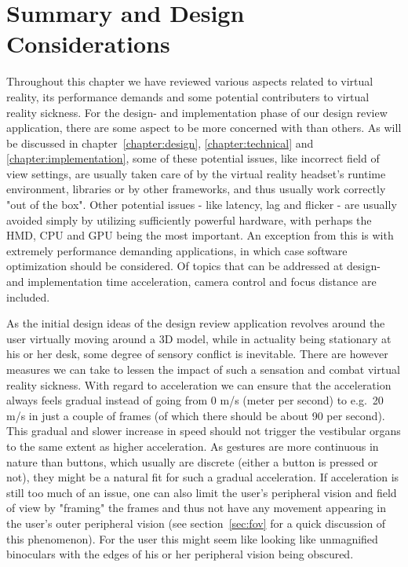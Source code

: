 
\section{Summary and Design Considerations}
Throughout this chapter we have reviewed various aspects related to virtual reality, its performance demands and some potential contributers to virtual reality sickness. 
For the design- and implementation phase of our design review application, there are some aspect to be more concerned with than others. As will be discussed in chapter~\ref{chapter:design}, 
\ref{chapter:technical} and \ref{chapter:implementation}, some of these potential issues, like incorrect field of view settings, are usually taken care of by the 
virtual reality headset's runtime environment, libraries or by other frameworks, and thus usually work correctly "out of the box". 
Other potential issues - like latency, lag and flicker - are usually avoided simply by utilizing sufficiently powerful hardware, with perhaps the HMD, CPU and GPU 
being the most important. An exception from this is with extremely performance demanding applications, in which case software optimization should be considered.
Of topics that can be addressed at design- and implementation time acceleration, camera control and focus distance are included.  

As the initial design ideas of the design review application revolves around the user virtually moving around a 3D model, while in actuality being stationary at his or her
desk, some degree of sensory conflict is inevitable. There are however measures we can take to lessen the impact of such a sensation and combat virtual reality sickness.
With regard to acceleration we can ensure that the acceleration always feels gradual instead of going from 0 m/s (meter per second) to e.g.~20 m/s in just a couple of frames 
(of which there should be about 90 per second). This gradual and slower increase in speed should not trigger the vestibular organs to the same extent as higher acceleration.
As gestures are more continuous in nature than buttons, which usually are discrete (either a button is pressed or not), they might be a natural fit for such a gradual acceleration. 
If acceleration is still too much of an issue, one can also limit the user's peripheral vision and field of view by "framing" the frames
and thus not have any movement appearing in the user's outer peripheral vision (see section~\vref{sec:fov} for a quick discussion of this phenomenon).
For the user this might seem like looking like unmagnified binoculars with the edges of his or her peripheral vision being obscured.  


